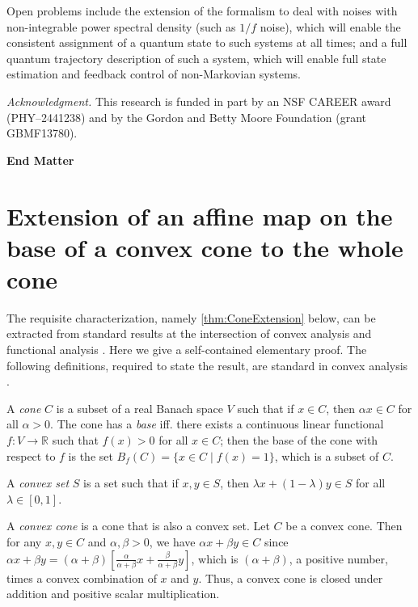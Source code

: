 \documentclass[
    11pt,
    letterpaper,
    reprint,
    notitlepage,
    superscriptaddress,
    aps,prx
]{revtex4-2}
\renewcommand{\mathbb}{\mathds}	%
\begin{document}
Open problems include the extension of the formalism to deal with noises with 
non-integrable power spectral density (such as $1/f$ noise), which will enable the consistent
assignment of a quantum state to such systems at all times; and a full quantum trajectory 
description of such a system, which will enable full state estimation and feedback control of 
non-Markovian systems. 


\emph{Acknowledgment.} This research is funded
in part by an NSF CAREER award (PHY–2441238)
and by the Gordon and Betty Moore Foundation (grant
GBMF13780).





\clearpage
\appendix
\onecolumngrid

\begin{center}
{\bf\large End Matter}
\end{center}

\section*{Extension of an affine map on the base of a convex cone to the whole cone}

The requisite characterization, namely \cref{thm:ConeExtension} below, can be extracted from standard
results at the intersection of convex analysis and functional analysis \cite{AsiEll80}. 
Here we give a self-contained elementary proof.
The following definitions, required to state the result, are standard in convex analysis \cite{Rock70}.

A \emph{cone} $C$ is a subset of a real Banach space $V$ such that if $x \in C$, 
then $\alpha x \in C$ for all $\alpha > 0$.
The cone has a \emph{base} iff. there exists a continuous linear functional $f: V \to \mathbb{R}$ 
such that $f(x) > 0$ for all $x \in C$; then the base of the cone with respect to $f$ is the set
$B_f(C) = \{ x \in C \mid f(x) = 1 \}$, which is a subset of $C$.

A \emph{convex set} $S$ is a set
such that if $x, y \in S$, then $\lambda x + (1-\lambda) y \in S$ for all $\lambda \in [0,1]$. 

A \emph{convex cone} is a cone that is also a convex set. 
Let $C$ be a convex cone. Then for any $x,y \in C$ and $\alpha,\beta > 0$, we have $\alpha x + \beta y \in C$ since
$\alpha x + \beta y = (\alpha +\beta)[\tfrac{\alpha}{\alpha+\beta}x + \tfrac{\beta}{\alpha+\beta}y]$,
which is $(\alpha +\beta)$, a positive number, 
times a convex combination of $x$ and $y$.
Thus, a convex cone is closed under addition and positive scalar multiplication.
\end{document}
